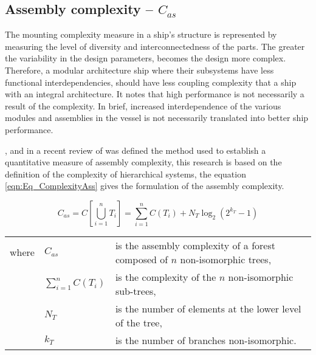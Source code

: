 \subsection{Assembly complexity -- $C_{as}$}
The mounting complexity measure in a ship's structure is represented by measuring the level of diversity and interconnectedness of the parts. The greater the variability in the design parameters, becomes the design more complex. Therefore, a modular architecture ship where their subsystems have less functional interdependencies, should have less coupling complexity that a ship with an integral architecture. It notes that high performance is not necessarily a result of the complexity. In brief,  increased interdependence of the various modules and assemblies in the vessel is not necessarily translated into better ship performance.


\cite{ceccatto1988complexity},  and in a recent review of \cite{Shannon01} was defined the method used to establish a quantitative measure of assembly complexity, this research is based on the definition of the complexity of hierarchical systems, the equation \ref{eqn:Eq_ComplexityAss} gives the formulation of the assembly complexity.


\begin{equation}
C_{as} = C\left[ \bigcup_{i=1}^n T_i \right] = \sum_{i=1}^{n} C(T_{i}) + N_T \log _2(2^{k_T}-1)
\label{eqn:Eq_ComplexityAss}
\end{equation}


\begin{tabular}{lll}
where & $C_{as}$ & is the assembly complexity of a forest composed of $n$ non-isomorphic trees,\\
& $\sum_{i=1}^{n} C(T_{i})$ & is the complexity of the $n$ non-isomorphic sub-trees,\\
& $N_T$ & is the number of elements at the lower level of the tree,\\
& $k_T$ & is the number of branches non-isomorphic.
\end{tabular}


